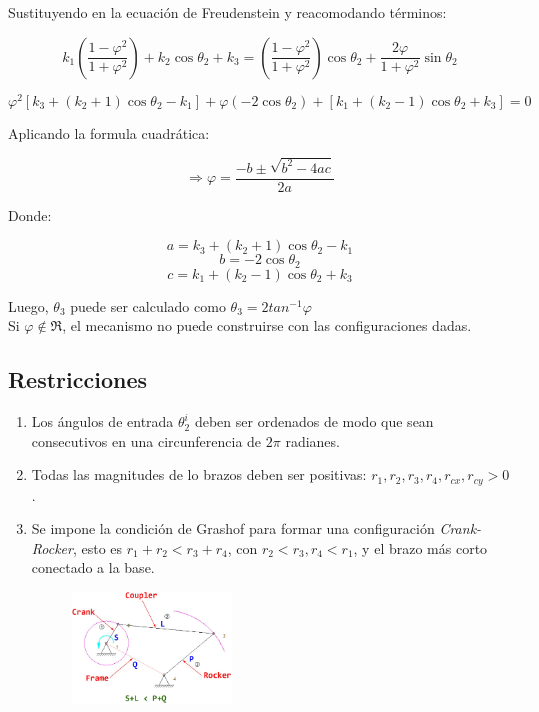 \documentclass[10pt,journal,compsoc]{styles/IEEEtran}
\begin{document}
 Sustituyendo en la ecuación de Freudenstein y reacomodando términos:
 
 $$k_1(\frac{1-\varphi^2}{1+\varphi^2})+ k_2 \cos \theta_2 + k_3 = (\frac{1-\varphi^2}{1+\varphi^2}) \cos \theta_2 + \frac{2 \varphi}{1+\varphi^2} \sin \theta_2$$
 
 \begin{footnotesize}
   $$\varphi^2[k_3+(k_2+1)\cos \theta_2 -k_1]+ \varphi(-2\cos \theta_2) + [k_1+(k_2-1)\cos \theta_2 + k_3]=0$$
 \end{footnotesize}


 
 Aplicando la formula cuadrática:
 
 $$\Rightarrow \varphi=\frac{-b\pm \sqrt{b^2-4ac}}{2a}$$

 Donde:

 $$a=k_3+(k_2+1)\cos \theta_2 -k_1$$
 $$b=-2\cos \theta_2$$
 $$c=k_1+(k_2-1)\cos \theta_2 + k_3$$

 Luego, $\theta_3$ puede ser calculado como $\theta_3=2tan^{-1} \varphi$\\

 Si $\varphi \not\in \Re$, el mecanismo no puede construirse con las configuraciones dadas.\\
 
\subsection{Restricciones}

 \begin{enumerate}
 \item Los \'angulos de entrada $\theta_2^i$ deben ser ordenados de modo que sean consecutivos en una circunferencia de $2\pi$ radianes.
 \item Todas las magnitudes de lo brazos deben ser positivas: $r_1,r_2,r_3,r_4,r_{cx},r_{cy}>0$.
 \item Se impone la condici\'on de Grashof para formar una configuraci\'on \emph{Crank-Rocker}, esto es $r_1+r_2<r_3+r_4$, con $r_2<r_3,r_4<r_1$, y el brazo m\'as corto conectado a la base.
   \begin{figure}[H]
    \centering
    \includegraphics[width = 0.4\textwidth]{grashof.png}
    \caption{}
  \end{figure}

 \end{enumerate}
 
\end{document}
